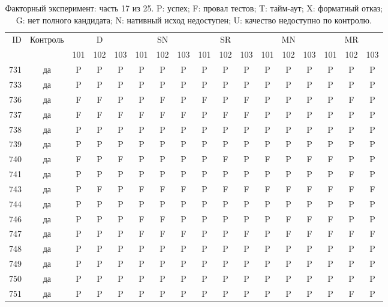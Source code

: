 \begin{table}[p]\centering\footnotesize
\setlength{\tabcolsep}{3pt}
\caption{Факторный эксперимент: часть 17 из 25. P: успех; F: провал тестов; T: тайм-аут; X: форматный отказ; G: нет полного кандидата; N: нативный исход недоступен; U: качество недоступно по контролю.}
\begin{tabular*}{\textwidth}{@{\extracolsep{\fill}}rcccccccccccccccc}\toprule
ID & Контроль & \multicolumn{3}{c}{D} & \multicolumn{3}{c}{SN} & \multicolumn{3}{c}{SR} & \multicolumn{3}{c}{MN} & \multicolumn{3}{c}{MR}\\
\cmidrule(lr){3-5}\cmidrule(lr){6-8}\cmidrule(lr){9-11}\cmidrule(lr){12-14}\cmidrule(lr){15-17}
 & & 101 & 102 & 103 & 101 & 102 & 103 & 101 & 102 & 103 & 101 & 102 & 103 & 101 & 102 & 103\\\midrule
731 & да & P & P & P & P & P & P & P & P & P & P & P & P & P & P & P\\
733 & да & P & P & P & P & P & P & P & P & P & P & P & P & P & P & P\\
736 & да & F & F & P & P & F & P & F & P & F & P & P & P & P & F & P\\
737 & да & F & F & F & F & F & F & P & F & F & P & P & P & P & P & P\\
738 & да & P & P & P & P & P & P & P & P & P & P & P & P & P & P & P\\
739 & да & P & P & P & P & P & P & P & P & P & P & P & P & P & P & P\\
740 & да & F & P & F & P & P & P & P & F & P & F & P & F & F & P & P\\
741 & да & P & P & P & P & P & P & P & P & P & P & P & P & P & F & P\\
743 & да & P & F & P & F & F & F & P & F & F & F & F & F & F & F & F\\
744 & да & P & P & P & P & P & P & P & P & P & P & P & P & P & P & P\\
746 & да & P & P & P & F & F & P & P & P & P & P & F & F & F & P & P\\
747 & да & P & P & P & F & F & F & P & P & F & P & F & F & F & F & F\\
748 & да & P & P & P & P & P & P & P & P & P & P & P & P & P & P & P\\
749 & да & P & P & P & P & P & P & P & P & P & P & P & P & P & P & P\\
750 & да & P & P & P & P & P & P & P & P & P & P & P & P & P & P & P\\
751 & да & P & P & P & P & P & P & P & P & P & P & P & P & P & F & P\\

\end{tabular*}
\end{table}
